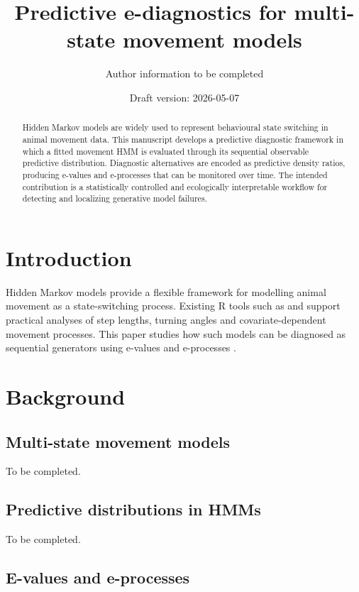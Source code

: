 \documentclass[11pt]{article}
\title{Predictive e-diagnostics for multi-state movement models}
\author{Author information to be completed}
\date{Draft version: 2026-05-07}
\begin{document}
\maketitle

\begin{abstract}
Hidden Markov models are widely used to represent behavioural state switching in animal movement data. This manuscript develops a predictive diagnostic framework in which a fitted movement HMM is evaluated through its sequential observable predictive distribution. Diagnostic alternatives are encoded as predictive density ratios, producing e-values and e-processes that can be monitored over time. The intended contribution is a statistically controlled and ecologically interpretable workflow for detecting and localizing generative model failures.
\end{abstract}

\section{Introduction}

Hidden Markov models provide a flexible framework for modelling animal movement as a state-switching process. Existing R tools such as \citet{michelot_2016_movehmm} and \citet{mcclintock_2018_momentuhmm} support practical analyses of step lengths, turning angles and covariate-dependent movement processes. This paper studies how such models can be diagnosed as sequential generators using e-values and e-processes \citep{vovk_wang_2021_evalues,howard_2020_time_uniform}.

\section{Background}

\subsection{Multi-state movement models}

To be completed.

\subsection{Predictive distributions in HMMs}

To be completed.

\subsection{E-values and e-processes}
\end{document}
